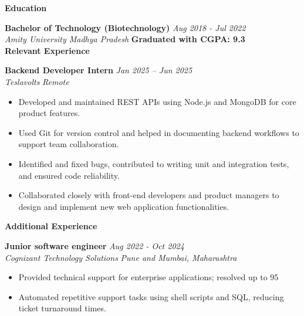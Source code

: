 \documentclass[11pt, a4paper]{article}
\newcommand{\addline}{\vspace*{1ex}{\color{black}\hrulefill}\par}
\begin{document}
\begin{minipage}[t]{0.65\textwidth} 
\vspace{10mm} 

\textbf{\Large {Education}}\addline{}
\textbf{Bachelor of Technology (Biotechnology)} \hfill \textit{Aug 2018 - Jul 2022}\\
\textit{Amity University Madhya Pradesh} \hfill \textbf{Graduated with CGPA: 9.3} \\

\textbf{\Large {Relevant Experience}}
\addline{}

\textbf{Backend Developer Intern} \hfill \textit{Jan 2025 – Jun 2025} \\
\textit{Teslavolts} \hfill \textit{Remote} 
\begin{itemize}
    \item Developed and maintained REST APIs using Node.js and MongoDB for core product features.
    \item Used Git for version control and helped in documenting backend workflows to support team collaboration.
    \item Identified and fixed bugs, contributed to writing unit and integration tests, and ensured code reliability.
    \item Collaborated closely with front-end developers and product managers to design and implement new web application functionalities. \\
\end{itemize}

\textbf{\Large {Additional Experience}}
\addline{}
\textbf{Junior software engineer} \hfill \textit{Aug 2022 - Oct 2024} \\
\textit{Cognizant Technology Solutions} \hfill \textit{Pune and Mumbai, Maharashtra} 
\begin{itemize}
    \item Provided technical support for enterprise applications; resolved up to 95%
    \item Automated repetitive support tasks using shell scripts and SQL, reducing ticket turnaround times.
\end{itemize}








\end{minipage}
\end{document}
